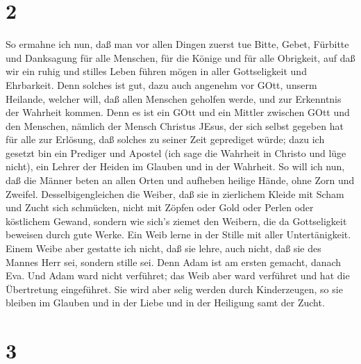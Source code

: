 \hypertarget{section-1}{%
\section{2}\label{section-1}}

 So ermahne ich nun, daß man vor allen Dingen zuerst tue
Bitte, Gebet, Fürbitte und Danksagung für alle Menschen, 
für die Könige und für alle Obrigkeit, auf daß wir ein ruhig und stilles
Leben führen mögen in aller Gottseligkeit und Ehrbarkeit. 
Denn solches ist gut, dazu auch angenehm vor GOtt, unserm Heilande,
 welcher will, daß allen Menschen geholfen werde, und zur
Erkenntnis der Wahrheit kommen.  Denn es ist ein GOtt und
ein Mittler zwischen GOtt und den Menschen, nämlich der Mensch Christus
JEsus,  der sich selbst gegeben hat für alle zur Erlösung,
daß solches zu seiner Zeit geprediget würde;  dazu ich
gesetzt bin ein Prediger und Apostel (ich sage die Wahrheit in Christo
und lüge nicht), ein Lehrer der Heiden im Glauben und in der Wahrheit.
 So will ich nun, daß die Männer beten an allen Orten und
aufheben heilige Hände, ohne Zorn und Zweifel. 
Desselbigengleichen die Weiber, daß sie in zierlichem Kleide mit Scham
und Zucht sich schmücken, nicht mit Zöpfen oder Gold oder Perlen oder
köstlichem Gewand,  sondern wie sich's ziemet den Weibern,
die da Gottseligkeit beweisen durch gute Werke.  Ein Weib
lerne in der Stille mit aller Untertänigkeit.  Einem Weibe
aber gestatte ich nicht, daß sie lehre, auch nicht, daß sie des Mannes
Herr sei, sondern stille sei.  Denn Adam ist am ersten
gemacht, danach Eva.  Und Adam ward nicht verführet; das
Weib aber ward verführet und hat die Übertretung eingeführet.
 Sie wird aber selig werden durch Kinderzeugen, so sie
bleiben im Glauben und in der Liebe und in der Heiligung samt der Zucht.

\hypertarget{section-2}{%
\section{3}\label{section-2}}

